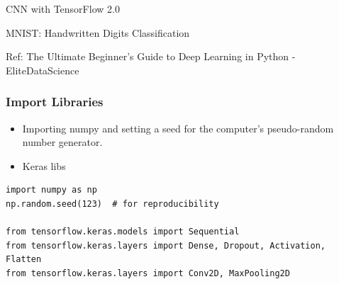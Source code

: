 \begin{frame}
  \begin{center}
    {\Large CNN with TensorFlow 2.0}
    
  \end{center}
\end{frame}

\begin{frame}
  \begin{center}
    {\Large MNIST: Handwritten Digits Classification}
    
    {\tiny Ref: The Ultimate Beginner's Guide to Deep Learning in Python - EliteDataScience}
  \end{center}
\end{frame}


\begin{frame}[fragile] \frametitle{Import Libraries}

\begin{itemize}
\item Importing numpy and setting a seed for the computer's pseudo-random number generator.
\item Keras libs
\end{itemize}
\begin{lstlisting}
import numpy as np
np.random.seed(123)  # for reproducibility

from tensorflow.keras.models import Sequential
from tensorflow.keras.layers import Dense, Dropout, Activation, Flatten
from tensorflow.keras.layers import Conv2D, MaxPooling2D
\end{lstlisting}
\end{frame}

